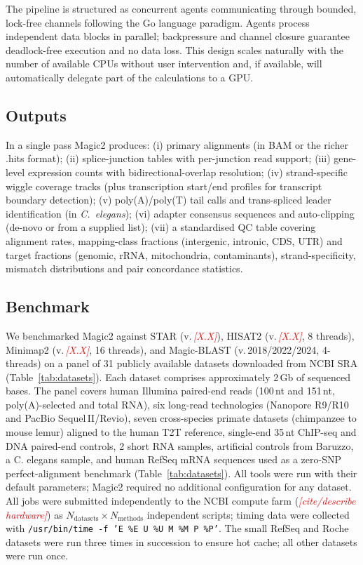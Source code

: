 \documentclass[11pt]{article}
\newcommand{\edcomment}[1]{\textcolor{red}{\textit{[#1]}}}
\begin{document}
The pipeline is structured as concurrent agents communicating through
bounded, lock-free channels following the Go language paradigm.
Agents process independent data blocks in parallel; backpressure and
channel closure guarantee deadlock-free execution and no data loss.
This design scales naturally with the number of available CPUs without
user intervention and,
if available, will automatically delegate part of the calculations to a GPU.


\subsection*{Outputs}

In a single pass Magic2 produces:
(i) primary alignments (in BAM or the richer .hits format);
(ii) splice-junction tables with per-junction read support;
(iii) gene-level expression counts with bidirectional-overlap resolution;
(iv) strand-specific wiggle coverage tracks (plus transcription start/end profiles
     for transcript boundary detection);
(v) poly(A)/poly(T) tail calls and trans-spliced leader identification
    (in \textit{C.\ elegans});
(vi) adapter consensus sequences and auto-clipping (de-novo or from a supplied list);
(vii) a standardised QC table covering
     alignment rates, mapping-class fractions (intergenic, intronic, CDS, UTR)
     and target fractions (genomic, rRNA, mitochondria, contaminants),
     strand-specificity,
     mismatch distributions and pair concordance statistics.

\subsection*{Benchmark}

We benchmarked Magic2 
against STAR (v.\,\edcomment{X.X}), HISAT2 (v.\,\edcomment{X.X}, 8 threads),
Minimap2 (v.\,\edcomment{X.X}, 16 threads), and Magic-BLAST
(v.\,2018/2022/2024, 4-threads) on a panel of 31 publicly available datasets
downloaded from NCBI SRA
(Table~\ref{tab:datasets}).
Each dataset comprises approximately 2\,Gb of sequenced bases.
The panel covers human Illumina paired-end reads (100\,nt and 151\,nt,
poly(A)-selected and total RNA), six long-read technologies (Nanopore
R9/R10 and PacBio Sequel\,II/Revio), seven cross-species primate
datasets (chimpanzee to mouse lemur) aligned to the human T2T
reference, single-end 35\,nt ChIP-seq and DNA paired-end controls,
2 short RNA samples,  
artificial controls from Baruzzo, a C. elegans sample,
and human RefSeq mRNA sequences used as a zero-SNP perfect-alignment
benchmark (Table~\ref{tab:datasets}).
All tools were run with their default parameters; Magic2 required no
additional configuration for any dataset.
All jobs were submitted independently to the NCBI compute farm
(\edcomment{cite/describe hardware}) as $N_\mathrm{datasets}\times
N_\mathrm{methods}$ independent scripts; timing data were collected
with \texttt{/usr/bin/time -f 'E \%E U \%U M \%M P \%P'}.
The small RefSeq and Roche datasets were run three times in succession to
ensure hot cache; all other datasets were run once.
\end{document}
